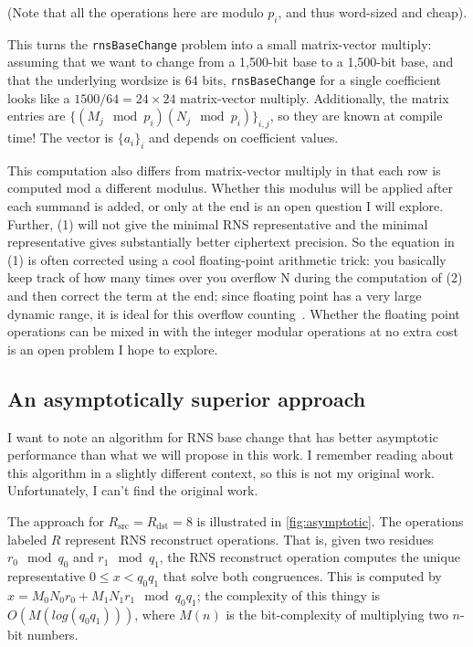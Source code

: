 (Note that all the operations here are modulo $p_i$, and thus word-sized and
cheap).

This turns the \verb!rnsBaseChange! problem into a small matrix-vector multiply:
assuming that we want to change from a 1,500-bit base to a 1,500-bit base, and
that the underlying wordsize is 64 bits, \verb!rnsBaseChange! for a single coefficient
looks like a $1500/64=24\times 24$ matrix-vector multiply.
Additionally, the matrix entries are $\{(M_j \mod p_i) (N_j \mod p_i)\}_{i,
j}$, so they are known at compile time!
The vector is $\{a_i\}_i$ and depends on coefficient values.

This computation also differs from matrix-vector multiply in that each row is
computed mod a different modulus.
Whether this modulus will be applied after each summand is added, or only at
the end is an open question I will explore.
Further, (1) will not give the minimal RNS representative and the minimal
representative gives substantially better ciphertext precision\cite{bajard2017full}.
So the equation in (1) is often corrected using a cool floating-point
arithmetic trick: you basically keep track of how many times over you overflow
N during the computation of (2) and then correct the term at the end; since
floating point has a very large dynamic range, it is ideal for this overflow
counting~\cite{lattigo-github}.
Whether the floating point operations can be mixed in with the integer modular
operations at no extra cost is an open problem I hope to explore.


\subsection{An asymptotically superior approach}
\label{sec:asymptotic}

\figAsymptotic

I want to note an algorithm for RNS base change that has better asymptotic
performance than what we will propose in this work.
I remember reading about this algorithm in a slightly different context, so
this is not my original work.
Unfortunately, I can't find the original work.

The approach for $R_{\textrm{src}} = R_{\textrm{dst}} = 8$ is illustrated in
\autoref{fig:asymptotic}. The operations labeled $R$ represent RNS reconstruct
operations. That is, given two residues $r_0 \mod q_0$ and $r_1 \mod q_1$, the
RNS reconstruct operation computes the unique representative
$0 \leq x < q_0q_1$ that solve both congruences. This is computed by $x =
M_0N_0r_0 + M_1N_1r_1 \mod q_0q_1$; the complexity of this thingy is
$O(M(log(q_0q_1)))$, where $M(n)$ is the bit-complexity of multiplying two
$n$-bit numbers.

